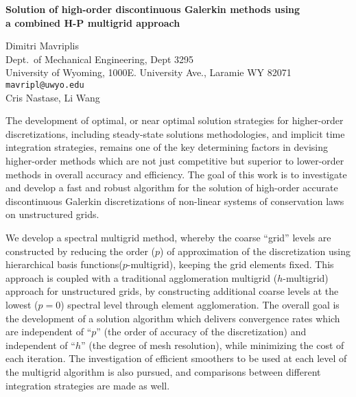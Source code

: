 \documentclass{report}
\begin{document}

\begin{center}
{\large
{\bf Solution of high-order discontinuous Galerkin methods using \\
	a combined H-P multigrid approach}}

	Dimitri Mavriplis \\
	Dept.~of Mechanical Engineering, Dept 3295 \\
	University of Wyoming, 1000E. University Ave., Laramie WY 82071 \\
	{\tt mavripl@uwyo.edu} \\
	Cris Nastase, Li Wang
\end{center}
The development of optimal, or near optimal solution
strategies for higher-order discretizations, including
steady-state solutions methodologies, and implicit time
integration strategies, remains one of the key determining
factors in devising higher-order methods which are not just
competitive but superior to lower-order methods in overall
accuracy and efficiency. The goal of this work is to
investigate and develop a fast and robust algorithm for the
solution of high-order accurate discontinuous Galerkin
discretizations of non-linear systems of conservation laws
on unstructured grids.

We develop a spectral multigrid
method, whereby the coarse ``grid'' levels are constructed by
reducing the order ($p$) of approximation of the
discretization using hierarchical basis
functions($p$-multigrid), keeping the grid elements fixed.
This approach is coupled with a traditional agglomeration
multigrid ($h$-multigrid) approach for unstructured grids,
by constructing additional coarse levels at the lowest
($p=0$) spectral level through element agglomeration. The
overall goal is the development of a solution algorithm
which delivers convergence rates which are independent of
``$p$'' (the order of accuracy of the discretization) and
independent of ``$h$'' (the degree of mesh resolution), while
minimizing the cost of each iteration. The investigation of
efficient smoothers to be used at each level of the
multigrid algorithm is also pursued, and comparisons between
different integration strategies are made as well.



\end{document}
